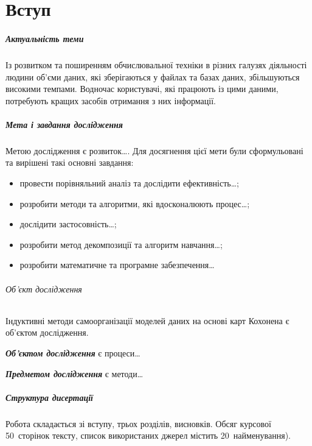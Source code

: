 \chapter*{Вступ}

\paragraph{Актуальність теми}

Із розвитком та поширенням обчислювальної техніки в різних галузях діяльності людини об'єми даних, які зберігаються у файлах та базах даних, збільшуються високими темпами. Водночас користувачі, які працюють із цими даними, потребують кращих засобів отримання з них інформації. 

\paragraph{Мета і завдання дослідження}
Метою дослідження є розвиток\ldots. Для досягнення цієї мети були сформульовані та вирішені такі основні завдання:

\begin{itemize}
 \item провести порівняльний аналіз та дослідити ефективність\ldots;
 \item розробити методи та алгоритми, які вдосконалюють процес\ldots; 
 \item дослідити застосовність\ldots;
 \item розробити метод декомпозиції та алгоритм навчання\ldots;
 \item розробити математичне та програмне забезпечення\ldots
\end{itemize}

\subparagraph{Об'єкт дослідження}
Індуктивні методи самоорганізації моделей даних на основі карт Кохонена є об'єктом дослідження.

\emph{\textbf{Об'єктом дослідження}} є процеси\ldots

\emph{\textbf{Предметом дослідження}} є методи\ldots 

\paragraph{Структура дисертації}

Робота складається зі вступу, трьох розділів, висновків. Обсяг курсової 50~сторінок тексту, список використаних джерел містить 20~найменування).